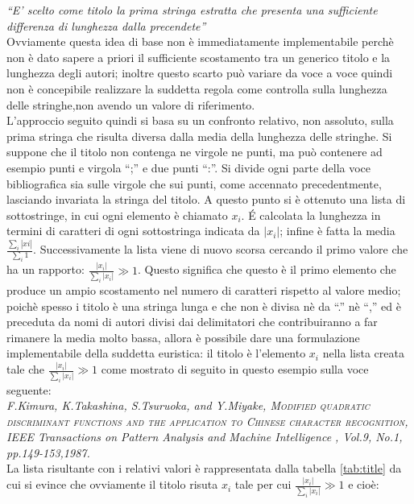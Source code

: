 \textit{``E' scelto come titolo la prima stringa estratta che presenta una sufficiente differenza di lunghezza dalla precendete''}\\

Ovviamente questa idea di base non è immediatamente implementabile perchè non è dato sapere a priori il sufficiente scostamento tra un generico titolo e la lunghezza degli autori; inoltre questo scarto può variare da voce a voce quindi non è concepibile realizzare la suddetta regola come controlla sulla lunghezza delle stringhe,non avendo un valore di riferimento.\\
L'approccio seguito quindi si basa su un confronto relativo, non assoluto, sulla prima stringa che risulta diversa dalla media della lunghezza delle stringhe. Si suppone che il titolo non contenga ne virgole ne punti, ma può contenere ad esempio punti e virgola ``;'' e due punti ``:''. Si divide ogni parte della voce bibliografica sia sulle virgole che sui punti, come accennato precedentmente, lasciando invariata la stringa del titolo. A questo punto si è ottenuto una lista di sottostringe, in cui ogni elemento è chiamato $x_i$. \'E calcolata la lunghezza in termini di caratteri di ogni sottostringa indicata da $|x_i|$; infine è fatta la media $\frac{\sum_i |xi|}{\sum_i 1}$. Successivamente la lista viene di nuovo scorsa cercando il primo valore che ha un rapporto: $ \frac{|x_i|}{ \sum_i |x_i|} \gg 1 $. Questo significa che questo è il primo elemento che produce un ampio scostamento nel numero di caratteri rispetto al valore medio; poichè spesso i titolo è una stringa lunga e che non è divisa nè da ``.'' nè ``,'' ed è preceduta da nomi di autori divisi dai delimitatori che contribuiranno a far rimanere la media molto bassa, allora è possibile dare una formulazione implementabile della suddetta euristica: il titolo è l'elemento $x_i$ nella lista creata tale che $ \frac{|x_i|}{ \sum_i |x_i|} \gg 1 $ come mostrato di seguito in questo esempio sulla voce seguente:\\


\textit{F.Kimura, K.Takashina, S.Tsuruoka, and Y.Miyake, \textsc{Modified quadratic discriminant functions and the application to Chinese character recognition}, IEEE Transactions on Pattern Analysis and Machine Intelligence , Vol.9, No.1, pp.149-153,1987. }\\

La lista risultante con i relativi valori è rappresentata dalla tabella \ref{tab:title} da cui si evince che ovviamente il titolo risuta $x_i$ tale per cui $ \frac{|x_i|}{ \sum_i |x_i|} \gg 1 $ e cioè:

